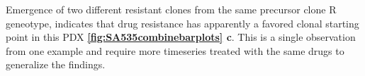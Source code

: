 Emergence of two different resistant clones from the same precursor clone R geneotype, indicates that drug resistance has apparently a favored clonal starting point in this PDX \textbf{\autoref{fig:SA535combinebarplots} c}. This is a single observation from one example and require more timeseries treated with the same drugs to generalize the findings.